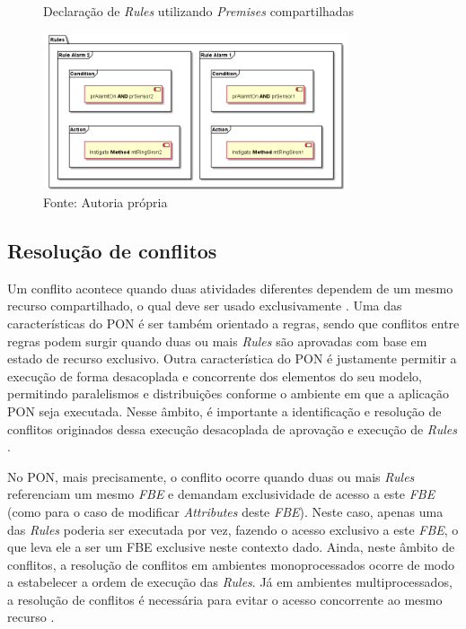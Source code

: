 \begin{figure}[!htb]
  \centering
  \caption{Declaração de \textit{Rules} utilizando \textit{Premises}
    compartilhadas}
  \includegraphics[width=0.8\textwidth]{../out/diagrams/rules_example/rules.png}
  \smallskip
  \caption*{Fonte: Autoria própria}
  \label{fig:rules_shared_ex}
\end{figure}

\subsection{Resolução de conflitos}\label{sec:conflitos}

Um conflito acontece quando duas atividades diferentes dependem de um mesmo
recurso compartilhado, o qual deve ser usado exclusivamente
\cite{doc_simao_2005}. Uma das características do PON é ser também orientado a
regras, sendo que conflitos entre regras podem surgir quando duas ou mais
\textit{Rules} são aprovadas com base em estado de recurso exclusivo. Outra
característica do PON é justamente permitir a execução de forma desacoplada e
concorrente dos elementos do seu modelo, permitindo paralelismos e distribuições
conforme o ambiente em que a aplicação PON seja executada. Nesse âmbito, é
importante a identificação e resolução de conflitos originados dessa execução
desacoplada de aprovação e execução de \textit{Rules} \cite{msc_pordeus_2017}.

No PON, mais precisamente, o conflito ocorre quando duas ou mais \textit{Rules}
referenciam um mesmo \textit{FBE} e demandam exclusividade de acesso a este
\textit{FBE} (como para o caso de modificar \textit{Attributes} deste
\textit{FBE}). Neste caso, apenas uma das \textit{Rules} poderia ser executada
por vez, fazendo o acesso exclusivo a este \textit{FBE}, o que leva ele a ser um
FBE exclusive neste contexto dado. Ainda, neste âmbito de conflitos, a resolução
de conflitos em ambientes monoprocessados ocorre de modo a estabelecer a ordem
de execução das \textit{Rules}. Já em ambientes multiprocessados, a resolução de
conflitos é necessária para evitar o acesso concorrente ao mesmo recurso
\cite{msc_valenca_2012,msc_Banaszewski_2009}.

